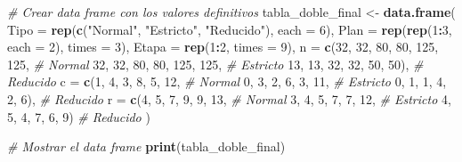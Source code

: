 \documentclass[
  12pt,
]{article}
\newenvironment{Shaded}{\begin{snugshade}}{\end{snugshade}}
\newcommand{\AttributeTok}[1]{\textcolor[rgb]{0.13,0.29,0.53}{#1}}
\newcommand{\CommentTok}[1]{\textcolor[rgb]{0.56,0.35,0.01}{\textit{#1}}}
\newcommand{\DecValTok}[1]{\textcolor[rgb]{0.00,0.00,0.81}{#1}}
\newcommand{\FunctionTok}[1]{\textcolor[rgb]{0.13,0.29,0.53}{\textbf{#1}}}
\newcommand{\NormalTok}[1]{#1}
\newcommand{\OtherTok}[1]{\textcolor[rgb]{0.56,0.35,0.01}{#1}}
\newcommand{\SpecialCharTok}[1]{\textcolor[rgb]{0.81,0.36,0.00}{\textbf{#1}}}
\newcommand{\StringTok}[1]{\textcolor[rgb]{0.31,0.60,0.02}{#1}}
\begin{document}
\begin{Shaded}
\begin{Highlighting}[]
\CommentTok{\# Crear data frame con los valores definitivos}
\NormalTok{tabla\_doble\_final }\OtherTok{\textless{}{-}} \FunctionTok{data.frame}\NormalTok{(}
  \AttributeTok{Tipo =} \FunctionTok{rep}\NormalTok{(}\FunctionTok{c}\NormalTok{(}\StringTok{"Normal"}\NormalTok{, }\StringTok{"Estricto"}\NormalTok{, }\StringTok{"Reducido"}\NormalTok{), }\AttributeTok{each =} \DecValTok{6}\NormalTok{),}
  \AttributeTok{Plan =} \FunctionTok{rep}\NormalTok{(}\FunctionTok{rep}\NormalTok{(}\DecValTok{1}\SpecialCharTok{:}\DecValTok{3}\NormalTok{, }\AttributeTok{each =} \DecValTok{2}\NormalTok{), }\AttributeTok{times =} \DecValTok{3}\NormalTok{),}
  \AttributeTok{Etapa =} \FunctionTok{rep}\NormalTok{(}\DecValTok{1}\SpecialCharTok{:}\DecValTok{2}\NormalTok{, }\AttributeTok{times =} \DecValTok{9}\NormalTok{),}
  \AttributeTok{n =} \FunctionTok{c}\NormalTok{(}\DecValTok{32}\NormalTok{, }\DecValTok{32}\NormalTok{, }\DecValTok{80}\NormalTok{, }\DecValTok{80}\NormalTok{, }\DecValTok{125}\NormalTok{, }\DecValTok{125}\NormalTok{,   }\CommentTok{\# Normal}
        \DecValTok{32}\NormalTok{, }\DecValTok{32}\NormalTok{, }\DecValTok{80}\NormalTok{, }\DecValTok{80}\NormalTok{, }\DecValTok{125}\NormalTok{, }\DecValTok{125}\NormalTok{,   }\CommentTok{\# Estricto}
        \DecValTok{13}\NormalTok{, }\DecValTok{13}\NormalTok{, }\DecValTok{32}\NormalTok{, }\DecValTok{32}\NormalTok{, }\DecValTok{50}\NormalTok{, }\DecValTok{50}\NormalTok{),    }\CommentTok{\# Reducido}
  \AttributeTok{c =} \FunctionTok{c}\NormalTok{(}\DecValTok{1}\NormalTok{, }\DecValTok{4}\NormalTok{, }\DecValTok{3}\NormalTok{, }\DecValTok{8}\NormalTok{, }\DecValTok{5}\NormalTok{, }\DecValTok{12}\NormalTok{,          }\CommentTok{\# Normal}
        \DecValTok{0}\NormalTok{, }\DecValTok{3}\NormalTok{, }\DecValTok{2}\NormalTok{, }\DecValTok{6}\NormalTok{, }\DecValTok{3}\NormalTok{, }\DecValTok{11}\NormalTok{,          }\CommentTok{\# Estricto}
        \DecValTok{0}\NormalTok{, }\DecValTok{1}\NormalTok{, }\DecValTok{1}\NormalTok{, }\DecValTok{4}\NormalTok{, }\DecValTok{2}\NormalTok{, }\DecValTok{6}\NormalTok{),          }\CommentTok{\# Reducido}
  \AttributeTok{r =} \FunctionTok{c}\NormalTok{(}\DecValTok{4}\NormalTok{, }\DecValTok{5}\NormalTok{, }\DecValTok{7}\NormalTok{, }\DecValTok{9}\NormalTok{, }\DecValTok{9}\NormalTok{, }\DecValTok{13}\NormalTok{,          }\CommentTok{\# Normal}
        \DecValTok{3}\NormalTok{, }\DecValTok{4}\NormalTok{, }\DecValTok{5}\NormalTok{, }\DecValTok{7}\NormalTok{, }\DecValTok{7}\NormalTok{, }\DecValTok{12}\NormalTok{,          }\CommentTok{\# Estricto}
        \DecValTok{4}\NormalTok{, }\DecValTok{5}\NormalTok{, }\DecValTok{4}\NormalTok{, }\DecValTok{7}\NormalTok{, }\DecValTok{6}\NormalTok{, }\DecValTok{9}\NormalTok{)           }\CommentTok{\# Reducido}
\NormalTok{)}

\CommentTok{\# Mostrar el data frame}
\FunctionTok{print}\NormalTok{(tabla\_doble\_final)}
\end{Highlighting}
\end{Shaded}
\end{document}
